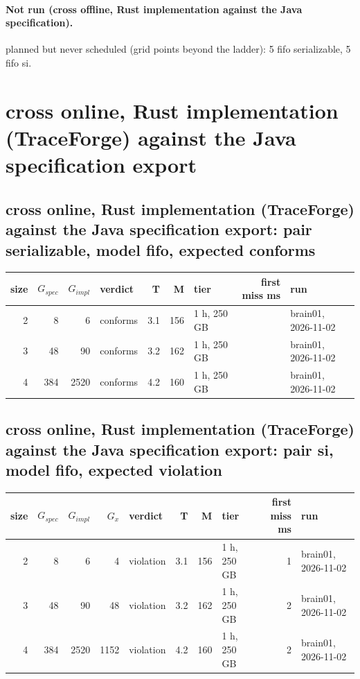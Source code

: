 \documentclass[10pt]{article}
\begin{document}
\paragraph{Not run (cross offline, Rust implementation against the Java specification).}
planned but never scheduled (grid points beyond the ladder): 5 fifo serializable, 5 fifo si.\par
\section*{cross online, Rust implementation (TraceForge) against the Java specification export}
\subsection*{cross online, Rust implementation (TraceForge) against the Java specification export: pair \textsf{serializable}, model fifo, expected conforms}
\begin{longtable}{@{}rrrlrrlrl@{}}
\toprule
size & $G_{\mathit{spec}}$ & $G_{\mathit{impl}}$ & verdict & T & M & tier & first miss ms & run \\
\midrule
\endhead
\color{red} 2 & 8 & 6 & conforms & 3.1 & 156 & 1 h, 250 GB &  & brain01, 2026-11-02 \\
\color{red} 3 & 48 & 90 & conforms & 3.2 & 162 & 1 h, 250 GB &  & brain01, 2026-11-02 \\
\color{red} 4 & 384 & 2520 & conforms & 4.2 & 160 & 1 h, 250 GB &  & brain01, 2026-11-02 \\
\bottomrule
\end{longtable}
\subsection*{cross online, Rust implementation (TraceForge) against the Java specification export: pair \textsf{si}, model fifo, expected violation}
\begin{longtable}{@{}rrrrlrrlrl@{}}
\toprule
size & $G_{\mathit{spec}}$ & $G_{\mathit{impl}}$ & $G_x$ & verdict & T & M & tier & first miss ms & run \\
\midrule
\endhead
\color{red} 2 & 8 & 6 & 4 & violation & 3.1 & 156 & 1 h, 250 GB & 1 & brain01, 2026-11-02 \\
\color{red} 3 & 48 & 90 & 48 & violation & 3.2 & 162 & 1 h, 250 GB & 2 & brain01, 2026-11-02 \\
\color{red} 4 & 384 & 2520 & 1152 & violation & 4.2 & 160 & 1 h, 250 GB & 2 & brain01, 2026-11-02 \\
\bottomrule
\end{longtable}
\end{document}
